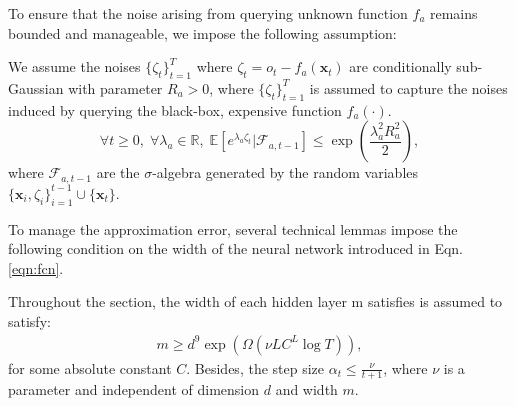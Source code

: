 To ensure that the noise arising from querying unknown function $f_a$ remains bounded and manageable, we impose the following assumption:
\begin{assumption}
\label{assumption:subgaussian_noise}
    We assume the noises $\{\zeta_{ t}\}_{t=1}^T$ where $\zeta_t = o_t - f_a(\mathbf{x}_t)$  are conditionally sub-Gaussian with parameter $R_{a} > 0$, where $\{\zeta_t\}_{t=1}^T$ is assumed to capture the noises induced by querying the black-box, expensive function $f_a(\cdot)$.
 \begin{equation*}
         \forall t \ge 0 , \; \forall \lambda_a \in \mathbb{R}, \;  \mathbb{E}[e^{\lambda_a\zeta_t} \rvert \mathcal{F}_{a,t-1}] \le \exp(\frac{\lambda_a^2 R_a^2}{2}),
 \end{equation*}
 where $\mathcal{F}_{a, t-1}$ are the $\sigma$-algebra generated by the random variables $\{\mathbf{x}_i, \zeta_i\} 
^{t-1}_{i=1} \cup \{\mathbf{x}_t\}$.
\end{assumption}

To manage the approximation error, several technical lemmas impose the following condition on the width of the neural network introduced in Eqn. \ref{eqn:fcn}.
\begin{condition}
    \label{condition:network_width}
    Throughout the section, the width of each hidden layer m satisfies is assumed to satisfy:
    \begin{align}
        m \ge d^9 \exp (\Omega(\nu LC^L\log T)), 
    \end{align}
for some absolute constant $C$. Besides, the step size $\alpha_t \le \frac{\nu}{t+1}$, where $\nu$ is a parameter and independent of dimension $d$ and width $m$.
\end{condition}



